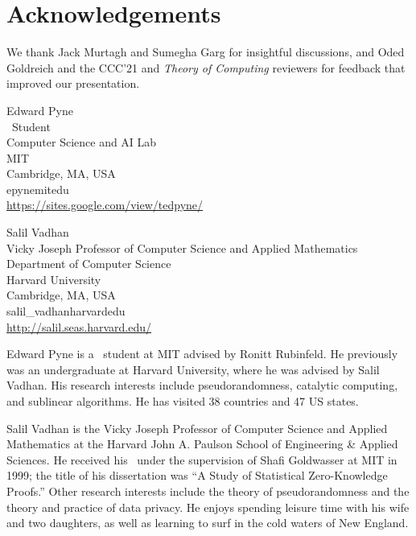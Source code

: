 \documentclass{toc}
\begin{document}
\section{Acknowledgements}
We thank Jack Murtagh and Sumegha Garg for insightful discussions, and 
Oded Goldreich and the CCC'21 and \emph{Theory of Computing} reviewers
for feedback that improved our presentation.




%
%
%
%


%
%
%
%
%
\begin{tocauthors}
\begin{tocinfo}[pyne]
 Edward Pyne\\
 \phd\ Student\\
 Computer Science and AI Lab\\
 MIT\\
 Cambridge, MA, USA\\
 epyne\tocat{}mit\tocdot{}edu \\   %
 \url{https://sites.google.com/view/tedpyne/}      %
\end{tocinfo}
%
\begin{tocinfo}[vadhan]      %
  Salil Vadhan\\
  Vicky Joseph Professor of Computer Science and Applied Mathematics\\
  Department of Computer Science\\
  Harvard University\\
  Cambridge, MA, USA\\
  salil\_vadhan\tocat{}harvard\tocdot{}edu \\
  \url{http://salil.seas.harvard.edu/}
\end{tocinfo}
\end{tocauthors}

%
%
%
%
%
%
%
%
%
%
%
%
%
%
%
%
%
%
%
%
\begin{tocaboutauthors}
\begin{tocabout}[pyne]  %
Edward Pyne is a \phd\ student at MIT advised by Ronitt Rubinfeld. He previously was an undergraduate at Harvard University, where he was advised by Salil Vadhan. His research interests include pseudorandomness, catalytic computing, and sublinear algorithms. He has visited %
%
38 %
countries and 
47 US states. %
%
\end{tocabout}

\begin{tocabout}[vadhan]
Salil Vadhan is the Vicky Joseph Professor of Computer Science and Applied Mathematics at the Harvard John A. Paulson School of Engineering \& Applied Sciences. He received his \phd\ under the supervision of Shafi Goldwasser at MIT in 1999; the title of his dissertation was ``A Study of Statistical Zero-Knowledge Proofs.'' Other research interests include the theory of pseudorandomness and the
theory and practice of data privacy. He enjoys spending leisure time with his wife and two 
daughters, as well as learning to surf in the cold waters of New England.
\end{tocabout}
\end{tocaboutauthors}
\end{document}

